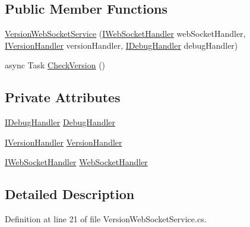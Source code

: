 \subsection*{Public Member Functions}
\begin{DoxyCompactItemize}
\item 
\mbox{\hyperlink{class_little_weeb_library_1_1_services_1_1_version_web_socket_service_ac36d79cd9d964d06594350e5971adb5e}{Version\+Web\+Socket\+Service}} (\mbox{\hyperlink{interface_little_weeb_library_1_1_handlers_1_1_i_web_socket_handler}{I\+Web\+Socket\+Handler}} web\+Socket\+Handler, \mbox{\hyperlink{interface_little_weeb_library_1_1_handlers_1_1_i_version_handler}{I\+Version\+Handler}} version\+Handler, \mbox{\hyperlink{interface_little_weeb_library_1_1_handlers_1_1_i_debug_handler}{I\+Debug\+Handler}} debug\+Handler)
\item 
async Task \mbox{\hyperlink{class_little_weeb_library_1_1_services_1_1_version_web_socket_service_af1a64a24e2d1b2299b82ba81b3c4a537}{Check\+Version}} ()
\end{DoxyCompactItemize}
\subsection*{Private Attributes}
\begin{DoxyCompactItemize}
\item 
\mbox{\hyperlink{interface_little_weeb_library_1_1_handlers_1_1_i_debug_handler}{I\+Debug\+Handler}} \mbox{\hyperlink{class_little_weeb_library_1_1_services_1_1_version_web_socket_service_a13ed681e1a924276595a18a6124028e5}{Debug\+Handler}}
\item 
\mbox{\hyperlink{interface_little_weeb_library_1_1_handlers_1_1_i_version_handler}{I\+Version\+Handler}} \mbox{\hyperlink{class_little_weeb_library_1_1_services_1_1_version_web_socket_service_ad2e1ecbf8218654adfe288d1a84196dd}{Version\+Handler}}
\item 
\mbox{\hyperlink{interface_little_weeb_library_1_1_handlers_1_1_i_web_socket_handler}{I\+Web\+Socket\+Handler}} \mbox{\hyperlink{class_little_weeb_library_1_1_services_1_1_version_web_socket_service_a6f8cb312585ce76dace5c81772d5a0b1}{Web\+Socket\+Handler}}
\end{DoxyCompactItemize}


\subsection{Detailed Description}


Definition at line 21 of file Version\+Web\+Socket\+Service.\+cs.




